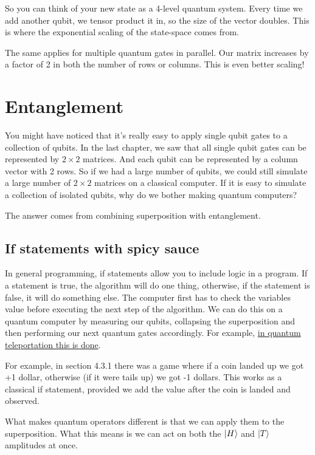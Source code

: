 \documentclass{book}
\begin{document}
So you can think of your new state as a 4-level quantum system. Every time we add another qubit, we tensor product it in, so the size of the vector doubles. This is where the exponential scaling of the state-space comes from.

The same applies for multiple quantum gates in parallel. Our matrix increases by a factor of 2 in both the number of rows or columns. This is even better scaling!

\section{ Entanglement } 

You might have noticed that it's really easy to apply single qubit gates to a collection of qubits. In the last chapter, we saw that all single qubit gates can be represented by $ 2 \times 2$ matrices. And each qubit can be represented by a column vector with 2 rows. So if we had a large number of qubits, we could still simulate a large number of $2 \times 2$ matrices on a classical computer. If it is easy to simulate a collection of isolated qubits, why do we bother making quantum computers? 

The answer comes from combining superposition with entanglement. 


\subsection{ If statements with spicy sauce }

In general programming, if statements allow you to include logic in a program. If a statement is true, the algorithm will do one thing, otherwise, if the statement is false, it will do something else. The computer first has to check the variables value before executing the next step of the algorithm. We can do this on a quantum computer by measuring our qubits, collapsing the superposition and then performing our next quantum gates accordingly. For example, \href{https://qiskit.org/textbook/ch-algorithms/teleportation.html}{in quantum teleportation this is done}. 

 For example, in section 4.3.1 there was a game where if a coin landed up we got +1 dollar, otherwise (if it were tails up) we got -1 dollars. This works as a classical if statement, provided we add the value after the coin is landed and observed. 

What makes quantum operators different is that we can apply them to the superposition. What this means is we can act on both the $\ket{H}$ and $\ket{T}$ amplitudes at once. 
\end{document}
